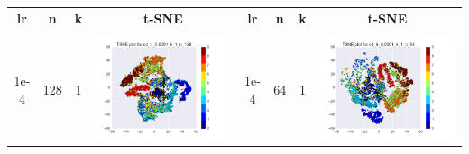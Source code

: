 \documentclass[12pt]{report}
\begin{document}
\begin{table}[H]
  \centering
  \begin{tabular}{ | c | c | c | c || c | c | c| c |}
    \hline
    \textbf{lr} & \textbf{n} & \textbf{k} & \textbf{t-SNE} & \textbf{lr} & \textbf{n} & \textbf{k} & \textbf{t-SNE} \\
     &  &  &  & & & & \\ \hline
    1e-4 & 128 & 1 &
    \begin{minipage}{.3\textwidth}
      \includegraphics[scale=0.25]{cd_lr_0_0001_k_1_n_128.png}
    \end{minipage}
	&
    1e-4 & 64 & 1 &
    \begin{minipage}{.3\textwidth}
      \includegraphics[scale=0.25]{cd_lr_0_0001_k_1_n_64.png}

\end{minipage}
\end{tabular}
\end{table}
\end{document}
